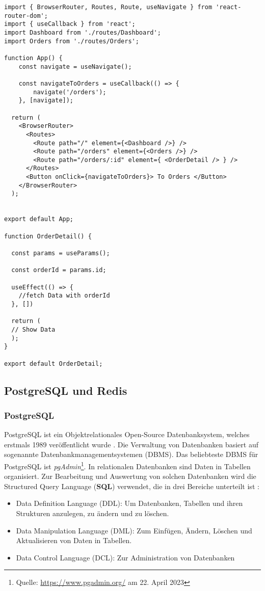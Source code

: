 \begin{lstlisting}[style=codeStyle, caption={Beispiel von verschiedenen Komponenten auf verschiedenen Pfaden \\
Quelle: \cite{react-key-concepts} (abgewandelt)}, label={lst:react-router-example}]
import { BrowserRouter, Routes, Route, useNavigate } from 'react-router-dom';
import { useCallback } from 'react';
import Dashboard from './routes/Dashboard';
import Orders from './routes/Orders';

function App() {
	const navigate = useNavigate();
	
	const navigateToOrders = useCallback(() => {
		navigate('/orders');
	}, [navigate]);

  return (
    <BrowserRouter>
      <Routes>
        <Route path="/" element={<Dashboard />} />
        <Route path="/orders" element={<Orders />} />
        <Route path="/orders/:id" element={ <OrderDetail /> } />
      </Routes>
      <Button onClick={navigateToOrders}> To Orders </Button>
    </BrowserRouter>
  );


export default App;

function OrderDetail() {

  const params = useParams();

  const orderId = params.id; 
  
  useEffect(() => {
	//fetch Data with orderId  
  }, [])

  return (
  // Show Data
  );
}

export default OrderDetail;
\end{lstlisting}
        \subsection{PostgreSQL und Redis}
        \subsubsection{PostgreSQL}
        \label{sec:PostgreSQL}
PostgreSQL ist ein Objektrelationales Open-Source Datenbanksystem, welches erstmals 1989 veröffentlicht wurde \cite{postgresql-book}. Die Verwaltung von Datenbanken basiert auf sogenannte Datenbankmanagementsystemen (DBMS). Das beliebteste DBMS für PostgreSQL ist \textit{pgAdmin}\footnote{Quelle: \url{https://www.pgadmin.org/} am 22. April 2023}.  In relationalen Datenbanken sind Daten in Tabellen organisiert. Zur Bearbeitung und Auswertung von solchen Datenbanken wird die Structured Query Language (\textbf{SQL}) verwendet, die in drei Bereiche unterteilt ist \cite{sql-book}:
\begin{itemize}
 \item Data Definition Language (DDL): Um Datenbanken, Tabellen und ihren Strukturen anzulegen, zu ändern und zu löschen.
 \item  Data Manipulation Language (DML): Zum Einfügen, Ändern, Löschen und Aktualisieren von Daten in Tabellen.
 \item Data Control Language (DCL): Zur Administration von Datenbanken
\end{itemize}

